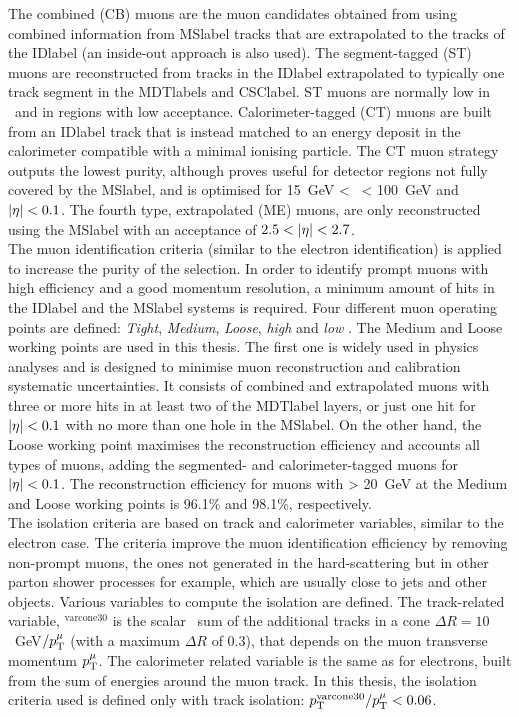 The combined (CB) muons are the muon candidates obtained from using combined information from \acrshort{MSlabel} tracks that are extrapolated to the tracks of the \acrshort{IDlabel} (an inside-out approach is also used). The segment-tagged (ST) muons are reconstructed from tracks in the \acrshort{IDlabel} extrapolated to typically one track segment in the \acrshort{MDTlabel}s and \acrshort{CSClabel}. ST muons are normally low in \pT\ and in regions with low acceptance. Calorimeter-tagged (CT) muons are built from an \acrshort{IDlabel} track that is instead matched to an energy deposit in the calorimeter compatible with a minimal ionising particle. The CT muon strategy outputs the lowest purity, although proves useful for detector regions not fully covered by the \acrshort{MSlabel}, and is optimised for 15~GeV < \pT\ < 100~GeV and $\abs{\eta}<0.1$. The fourth type, extrapolated (ME) muons, are only reconstructed using the \acrshort{MSlabel} with an acceptance of $2.5 < \abs{\eta} < 2.7$.\\

The muon identification criteria (similar to the electron identification) is applied to increase the purity of the selection. In order to identify prompt muons with high efficiency and a good momentum resolution, a minimum amount of hits in the \acrshort{IDlabel} and the \acrshort{MSlabel} systems is required. Four different muon operating points are defined: \textit{Tight}, \textit{Medium}, \textit{Loose}, \textit{high \pT} and \textit{low \pT}. The Medium and Loose working points are used in this thesis. The first one is widely used in physics analyses and is designed to minimise muon reconstruction and calibration systematic uncertainties. It consists of combined and extrapolated muons with three or more hits in at least two of the \acrshort{MDTlabel} layers, or just one hit for $\abs{\eta}<0.1$ with no more than one hole in the \acrshort{MSlabel}. On the other hand, the Loose working point maximises the reconstruction efficiency and accounts all types of muons, adding the segmented- and calorimeter-tagged muons for $\abs{\eta}<0.1$. The reconstruction efficiency for muons with \pT > 20~GeV at the Medium and Loose working points is 96.1\% and 98.1\%, respectively. \\

The isolation criteria are based on track and calorimeter variables, similar to the electron case. The criteria improve the muon identification efficiency by removing non-prompt muons, the ones not generated in the hard-scattering but in other parton shower processes for example, which are usually close to jets and other objects. Various variables to compute the isolation are defined. The track-related variable, \pT$^{\text{varcone30}}$ is the scalar \pT\ sum of the additional tracks in a cone $\Delta R=10$~GeV$/p_{\text{T}}^\mu$ (with a maximum $\Delta R$ of 0.3), that depends on the muon transverse momentum $p_{\text{T}}^\mu$. The calorimeter related variable is the same as for electrons, built from the sum of energies around the muon track. In this thesis, the isolation criteria used is defined only with track isolation: $p_{\text{T}}^\text{varcone30}/p_{\text{T}}^\mu<0.06$.       

